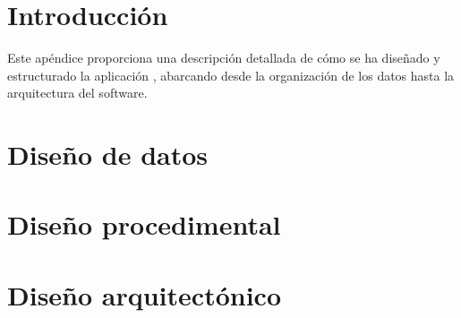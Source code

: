 
\section{Introducción}

Este apéndice proporciona una descripción detallada de cómo se ha diseñado y estructurado la aplicación , abarcando desde la organización de los datos hasta la arquitectura del software.

\section{Diseño de datos}



\section{Diseño procedimental}



\section{Diseño arquitectónico}


